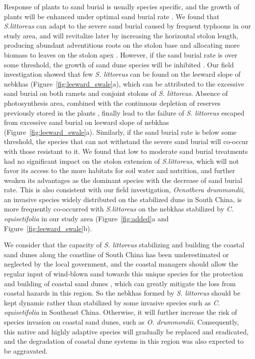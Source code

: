 \documentclass[]{interact}
\theoremstyle{plain}%
\theoremstyle{definition}
\theoremstyle{remark}
\begin{document}
Response of plants to sand burial is usually species specific, and the growth of plants will be enhanced under optimal sand burial rate \citep{noletUAVimagingModelGrowth2018}. We found that \textit{S.littoreus} can adapt to the severe sand burial caused by frequent typhoons in our study area, and will revitalize later by increasing the horizontal stolon length, producing abundant adventitious roots on the stolon base and allocating more biomass to leaves on the stolon apex \citep{yuanEffectsSandAccretion1993}. However, if the sand burial rate is over some threshold, the growth of sand dune species will be inhibited \citep{maunEffectsBurialSand1996, shiEffectsSandBurial2004}. Our field investigation showed that few \textit{S. littoreus} can be found on the leeward slope of nebkhas (Figure~\ref{fig:leeward_swale}a), which can be attributed to the excessive sand burial on both ramets and conjoint stolons of \textit{S. littoreus}. Absence of photosynthesis area, combined with the continuous depletion of reserves previously stored in the plants \citep{frosiniGlobalChangeResponse2012}, finally lead to the failure of \textit{S. littoreus} escaped from excessive sand burial on leeward slope of nebkhas (Figure~\ref{fig:leeward_swale}a).  Similarly, if the sand burial rate is below some threshold, the species that can not withstand the severe sand burial will co-occur with those resistant to it. We found that low to moderate sand burial treatments had no significant impact on the stolon extension of \textit{S.littoreus}, which will not favor its access to the more habitats for soil water and nutrition, and further weaken its advantages as the dominant species with the decrease of sand burial rate. This is also consistent with our field investigation, \textit{Oenothera drummondii}, an invasive species widely distributed on the stabilized dune in South China, is more frequently co-occurred with \textit{S.littoreus} on the nebkhas stabilized by \textit{C. equisetifolia} in our study area (Figure~\ref{fig:added}a and Figure~\ref{fig:leeward_swale}b).

We consider that the capacity of \textit{S. littoreus} stabilizing and building the coastal sand dunes along the coastline of South China has been  underestimated or neglected by the local government, and the coastal managers should allow the regular input of wind-blown sand towards this unique species for the protection and building of coastal sand dunes \citep{noletUAVimagingModelGrowth2018}, which can greatly mitigate the loss from coastal hazards in this region. So the nebkhas formed by \textit{S. littoreus} should be kept dynamic rather than stabilized by some invasive species such as \textit{C. equisetifolia} in Southeast China. Otherwise, it will further increase the risk of species invasion on coastal sand dunes, such as \textit{O. drummondii}. Consequently, this native and highly adaptive species will gradually be replaced and eradicated, and  the degradation of coastal dune systems in this region was also expected to be aggravated.
\end{document}
